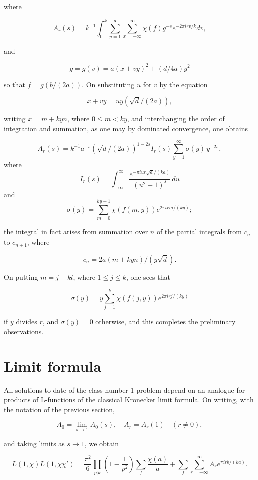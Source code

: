 where

\[A_r(s) = k^{-1} \int_0^k \sum_{y=1}^{\infty} \sum_{x=-\infty}^{\infty} \chi(f) g^{-s} e^{-2\pi i r v/k} dv,\]

and

\[g = g(v) = a(x+vy)^2 + (d/4a)y^2\]

so that $f = g(b/(2a))$. On substituting $u$ for $v$ by the equation

\[x+vy=uy(\sqrt{d}/(2a)),\]

writing $x = m + kyn$, where $0 \le m < ky$, and interchanging the order of integration and summation, as one may by dominated convergence, one obtains

\[ A_r(s) = k^{-1} a^{-s} (\sqrt{d}/(2a))^{1-2s} I_r(s) \sum_{y=1}^{\infty} \sigma(y) \, y^{-2s}, \]
where
\[ I_r(s) = \int_{-\infty}^{\infty} \frac{e^{-\pi i u r \sqrt{d}/(ka)}}{(u^2+1)^s} \, du \]
and
\[\sigma(y) = \sum_{m=0}^{ky-1} \chi(f(m,y)) e^{2\pi i r m/(ky)};\]

the integral in fact arises from summation over $n$ of the partial integrals from $c_n$ to $c_{n+1}$, where

\[c_n = 2a(m + kyn)/(y\sqrt{d}).\]

On putting $m = j + kl$, where $1 \le j \le k$, one sees that

\[\sigma(y) = y \sum_{j=1}^{k} \chi(f(j,y)) e^{2\pi i r j/(ky)}\]

if $y$ divides $r$, and $\sigma(y) = 0$ otherwise, and this completes the preliminary observations.

\section{Limit formula}\label{sec:ch5_3}

All solutions to date of the class number 1 problem depend on an analogue for products of L-functions of the classical Kronecker limit formula. On writing, with the notation of the previous section,

\[A_0 = \lim_{s \to 1} A_0(s), \quad A_r = A_r(1) \quad (r \neq 0),\]

and taking limits as $s \to 1$, we obtain

\begin{equation}\tag{2}\label{eq:ch5_eq2}
L(1,\chi)L(1,\chi\chi') = \frac{\pi^2}{6} \prod_{p|k} \left(1 - \frac{1}{p^2}\right) \sum_{f} \frac{\chi(a)}{a} + \sum_{f} \sum_{r=-\infty}^{\infty} A_r e^{\pi i r b/(ka)}.
\end{equation}

